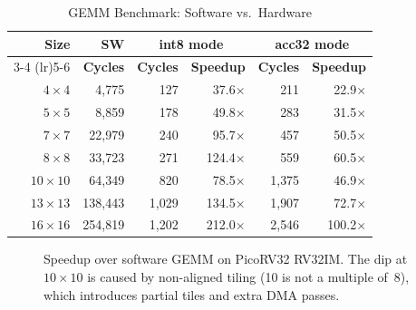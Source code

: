 \documentclass[conference]{IEEEtran}
\begin{document}
\begin{table}[t]
\centering
\caption{GEMM Benchmark: Software vs.\ Hardware}
\label{tab:benchmark}
\begin{tabular}{@{}rrrrrr@{}}
\toprule
\textbf{Size} & \textbf{SW} & \multicolumn{2}{c}{\textbf{int8 mode}} & \multicolumn{2}{c}{\textbf{acc32 mode}} \\
\cmidrule(lr){3-4} \cmidrule(lr){5-6}
 & \textbf{Cycles} & \textbf{Cycles} & \textbf{Speedup} & \textbf{Cycles} & \textbf{Speedup} \\
\midrule
$4{\times}4$   &   4{,}775 &    127 &  37.6$\times$ &    211 & 22.9$\times$ \\
$5{\times}5$   &   8{,}859 &    178 &  49.8$\times$ &    283 & 31.5$\times$ \\
$7{\times}7$   &  22{,}979 &    240 &  95.7$\times$ &    457 & 50.5$\times$ \\
$8{\times}8$   &  33{,}723 &    271 & 124.4$\times$ &    559 & 60.5$\times$ \\
$10{\times}10$ &  64{,}349 &    820 &  78.5$\times$ & 1{,}375 & 46.9$\times$ \\
$13{\times}13$ & 138{,}443 & 1{,}029 & 134.5$\times$ & 1{,}907 & 72.7$\times$ \\
$16{\times}16$ & 254{,}819 & 1{,}202 & 212.0$\times$ & 2{,}546 & 100.2$\times$ \\
\bottomrule
\end{tabular}
\end{table}

\begin{figure}[t]
\centering
{}
\caption{Speedup over software GEMM on PicoRV32 RV32IM. The dip at $10{\times}10$ is caused by non-aligned tiling (10 is not a multiple of~8), which introduces partial tiles and extra DMA passes.}
\label{fig:speedup}
\end{figure}
\end{document}
